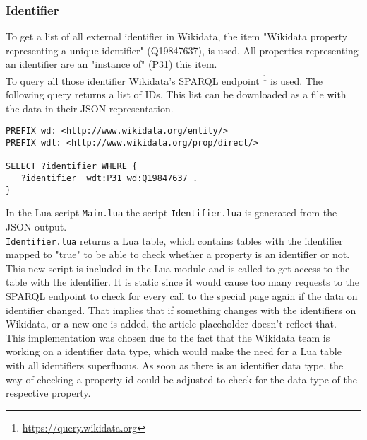 \subsubsection{Identifier}

To get a list of all external identifier in Wikidata, the item "Wikidata property representing a unique identifier" (Q19847637), is used. All properties representing an identifier are an "instance of" (P31) this item. \\
To query all those identifier Wikidata's SPARQL endpoint \footnote{\href{https://query.wikidata.org}{https://query.wikidata.org}} is used. The following query returns a list of IDs. This list can be downloaded as a file with the data in their JSON representation. \\

\begin{lstlisting}[frame=single] 
PREFIX wd: <http://www.wikidata.org/entity/>
PREFIX wdt: <http://www.wikidata.org/prop/direct/>

SELECT ?identifier WHERE {
   ?identifier  wdt:P31 wd:Q19847637 . 
}
\end{lstlisting}
In the Lua script \texttt{Main.lua} the script \texttt{Identifier.lua} is generated from the JSON output. \\  \texttt{Identifier.lua} returns a Lua table, which contains tables with the identifier mapped to "true" to be able to check whether a property is an identifier or not. This new script is included in the Lua module and is called to get access to the table with the identifier. It is static since it would cause too many requests to the SPARQL endpoint to check for every call to the special page again if the data on identifier changed. That implies that if something changes with the identifiers on Wikidata, or a new one is added, the article placeholder doesn't reflect that. \\
This implementation was chosen due to the fact that the Wikidata team is working on a identifier data type, which would make the need for a Lua table with all identifiers superfluous. As soon as there is an identifier data type, the way of checking a property id could be adjusted to check for the data type of the respective property. 
